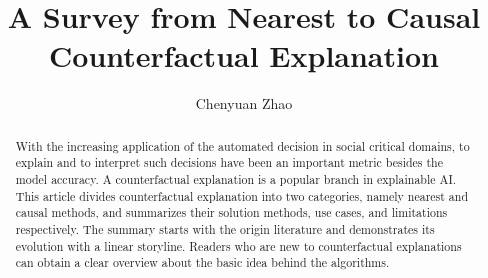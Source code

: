 \documentclass[runningheads]{llncs}
\begin{document}
%
\title{A Survey from Nearest to Causal Counterfactual Explanation}
%
%
\author{Chenyuan Zhao
}

%
\maketitle              %
%
\begin{abstract}
With the increasing application of the automated decision in social critical domains, to explain and to interpret such decisions have been an important metric besides the model accuracy. A counterfactual explanation is a popular branch in explainable AI. This article divides counterfactual explanation into two categories, namely nearest and causal methods, and summarizes their solution methods, use cases, and limitations respectively. The summary starts with the origin literature and demonstrates its evolution with a linear storyline. Readers who are new to counterfactual explanations can obtain a clear overview about the basic idea behind the algorithms.


\end{abstract}
%

%


%





%
%
% 
% 
%

%
{}
\end{document}
